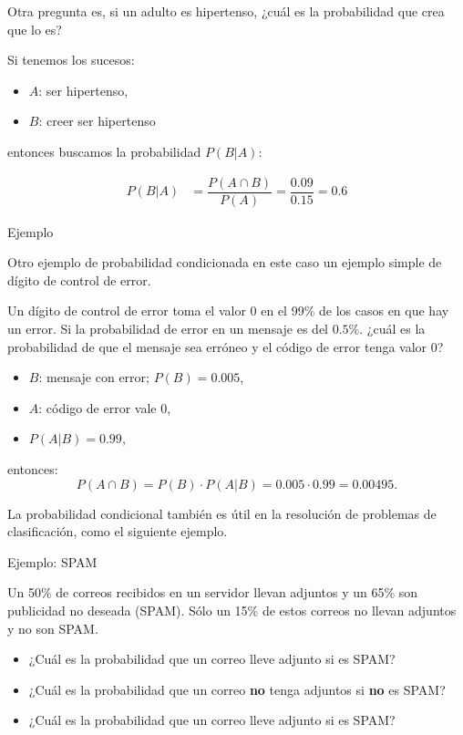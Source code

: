 \documentclass[
  letterpaper,
  DIV=11,
  numbers=noendperiod]{scrreprt}
\providecommand{\tightlist}{%
  \setlength{\itemsep}{0pt}\setlength{\parskip}{0pt}}\usepackage{longtable,booktabs,array}
\begin{document}
Otra pregunta es, si un adulto es hipertenso, ¿cuál es la probabilidad
que crea que lo es?

Si tenemos los sucesos:

\begin{itemize}
\tightlist
\item
  \(A\): ser hipertenso,
\item
  \(B\): creer ser hipertenso
\end{itemize}

entonces buscamos la probabilidad \(P(B|A)\):

\[
\begin{array}{rl}
P(B|A) & =\dfrac{P(A\cap B)}{P(A)}=\dfrac{0.09}{0.15}=
0.6
\end{array}
\]

Ejemplo

Otro ejemplo de probabilidad condicionada en este caso un ejemplo simple
de dígito de control de error.

Un dígito de control de error toma el valor 0 en el 99\% de los casos en
que hay un error. Si la probabilidad de error en un mensaje es del
\(0.5\%\). ¿cuál es la probabilidad de que el mensaje sea erróneo y el
código de error tenga valor 0?

\begin{itemize}
\tightlist
\item
  \(B\): mensaje con error; \(P(B)=0.005\),
\item
  \(A\): código de error vale 0,
\item
  \(P(A|B)=0.99\),
\end{itemize}

entonces: \[P(A\cap B)=P(B)\cdot P(A|B)=0.005\cdot 0.99=0.00495.\]

La probabilidad condicional también es útil en la resolución de
problemas de clasificación, como el siguiente ejemplo.

Ejemplo: SPAM

Un 50\% de correos recibidos en un servidor llevan adjuntos y un 65\%
son publicidad no deseada (SPAM). Sólo un 15\% de estos correos no
llevan adjuntos y no son SPAM.

\begin{itemize}
\tightlist
\item
  ¿Cuál es la probabilidad que un correo lleve adjunto si es SPAM?
\item
  ¿Cuál es la probabilidad que un correo \textbf{no} tenga adjuntos si
  \textbf{no} es SPAM?
\item
  ¿Cuál es la probabilidad que un correo lleve adjunto si es SPAM?
\end{itemize}
\end{document}

